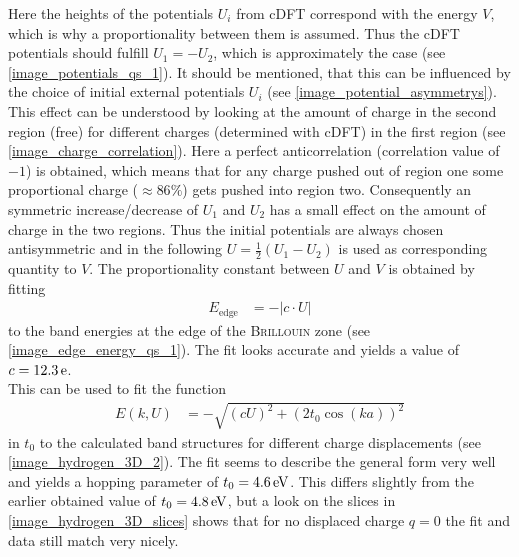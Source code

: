 Here the heights of the potentials $U_i$ from cDFT correspond with the energy $V$, which is why a proportionality between them is assumed. Thus the cDFT potentials should fulfill $U_1 = - U_2$, which is approximately the case (see \cref{image_potentials_qs_1}). It should be mentioned, that this can be influenced by the choice of initial external potentials $U_i$ (see \cref{image_potential_asymmetrys}). This effect can be understood by looking at the amount of charge in the second region (free) for different charges (determined with cDFT) in the first region (see \cref{image_charge_correlation}). Here a perfect anticorrelation (correlation value of $-1$) is obtained, which means that for any charge pushed out of region one some proportional charge ($\approx 86\%$) gets pushed into region two. Consequently an symmetric increase/decrease of $U_1$ and $U_2$ has a small effect on the amount of charge in the two regions. Thus the initial potentials are always chosen antisymmetric and in the following $U = \frac{1}{2}(U_1 - U_2)$ is used as corresponding quantity to $V$. The proportionality constant between $U$ and $V$ is obtained by fitting
\begin{align}
	E_\text{edge} &= -\left|c \cdot U\right|
\end{align}
to the band energies at the edge of the \textsc{Brillouin} zone (see \cref{image_edge_energy_qs_1}). The fit looks accurate and yields a value of $c = \unit[12.3]{e}$.\\
This can be used to fit the function
\begin{align}
	E\left(k, U\right) &= - \sqrt{\left(cU\right)^2 + \left(2t_0\cos(ka)\right)^2}
\end{align}
in $t_0$ to the calculated band structures for different charge displacements (see \cref{image_hydrogen_3D_2}). The fit seems to describe the general form very well and yields a hopping parameter of $t_0 = \unit[4.6]{eV}$. This differs slightly from the earlier obtained value of $t_0 = \unit[4.8]{eV}$, but a look on the slices in \cref{image_hydrogen_3D_slices} shows that for no displaced charge $q = 0$ the fit and data still match very nicely.\\
